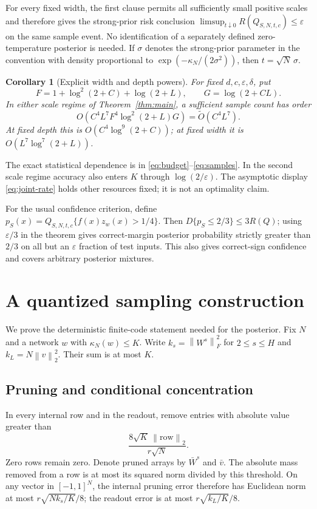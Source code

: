\documentclass[11pt]{article}
\newtheorem{corollary}[theorem]{Corollary}
\newcommand{\norm}[1]{\left\|#1\right\|}
\begin{document}
For every fixed width, the first clause permits all sufficiently small
positive scales and therefore gives the strong-prior risk conclusion
$\limsup_{t\downarrow0}R(Q_{S,N,t,c})\le\varepsilon$ on the same sample
event. No identification of a separately defined zero-temperature posterior
is needed. If $\sigma$ denotes the strong-prior parameter in the convention
with density proportional to $\exp(-\kappa_N/(2\sigma^2))$, then
$t=\sqrt N\,\sigma$.

\begin{corollary}[Explicit width and depth powers]\label{cor:powers}
For fixed $d,c,\varepsilon,\delta$, put
\[
 F=1+\log^2(2+C)+\log(2+L),\qquad G=\log(2+CL).
\]
In either scale regime of Theorem~\ref{thm:main}, a sufficient sample
count has order
\begin{equation}\label{eq:joint-rate}
 O\!\left(C^4L^7F^4\log^2(2+L)G\right)
   =\widetilde O(C^4L^7).
\end{equation}
At fixed depth this is $O(C^4\log^9(2+C))$; at fixed width it is
$O(L^7\log^7(2+L))$.
\end{corollary}

The exact statistical dependence is in \eqref{eq:budget}--\eqref{eq:samples}.
In the second scale regime accuracy also enters $K$ through
$\log(2/\varepsilon)$. The asymptotic display \eqref{eq:joint-rate} holds
other resources fixed; it is not an optimality claim.

For the usual confidence criterion, define
$p_S(x)=Q_{S,N,t,c}\{f(x)z_w(x)>1/4\}$. Then
$D\{p_S\le2/3\}\le3R(Q)$; using $\varepsilon/3$ in the theorem gives
correct-margin posterior probability strictly greater than $2/3$ on all
but an $\varepsilon$ fraction of test inputs. This also gives correct-sign
confidence and covers arbitrary posterior mixtures.

\section{A quantized sampling construction}

We prove the deterministic finite-code statement needed for the posterior.
Fix $N$ and a network $w$ with $\kappa_N(w)\le K$. Write
$k_s=\norm{W^s}_F^2$ for $2\le s\le H$ and
$k_L=N\norm v_2^2$. Their sum is at most $K$.

\subsection{Pruning and conditional concentration}
In every internal row and in the readout, remove entries with absolute
value greater than
\[
 \frac{8\sqrt K\,\norm{\text{row}}_2}{r\sqrt N}.
\]
Zero rows remain zero. Denote pruned arrays by $\bar W^s$ and $\bar v$.
The absolute mass removed from a row is at most its squared norm divided
by this threshold. On any vector in $[-1,1]^N$, the internal pruning error
therefore has Euclidean norm at most
$r\sqrt{Nk_s/K}/8$; the readout error is at most
$r\sqrt{k_L/K}/8$.
\end{document}

